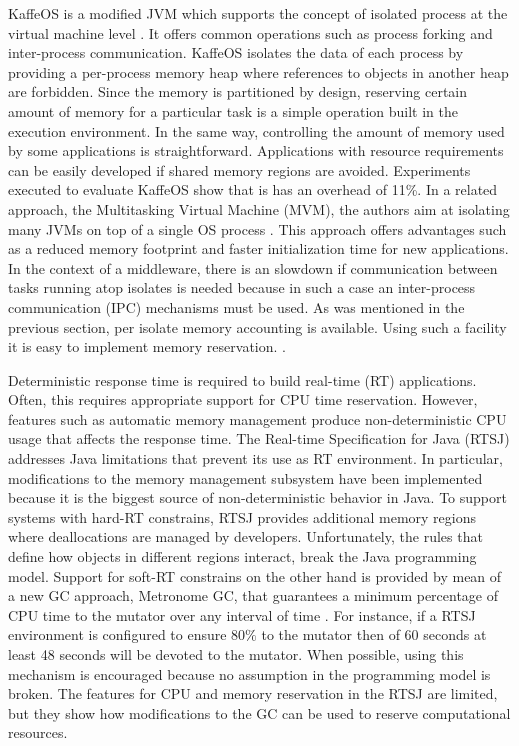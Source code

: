 KaffeOS is a modified JVM which supports the concept of isolated process at the virtual machine level \cite{back_processes_2000, Back:2005:KJR:1075382.1075383}.
It offers common operations such as process forking and inter-process communication.
KaffeOS isolates the data of each process by providing a per-process memory heap where references to objects in another heap are forbidden.
Since the memory is partitioned by design, reserving certain amount of memory for a particular task is a simple operation built in the execution environment.
In the same way, controlling the amount of memory used by some applications is straightforward.
Applications with resource requirements can be easily developed if shared memory regions are avoided.
Experiments executed to evaluate KaffeOS show that is has an overhead of 11\%.
In a related approach, the Multitasking Virtual Machine (MVM), the authors aim at isolating many JVMs on top of
a single OS process \cite{czajkowski_multitasking_2001}.
This approach offers advantages such as a reduced memory footprint and faster initialization time for new applications.
In the context of a middleware, there is an slowdown if communication between tasks running atop isolates is needed because in such a case an inter-process communication (IPC) mechanisms must be used.
As was mentioned in the previous section, per isolate memory accounting is available.
Using such a facility it is easy to implement memory reservation. . 

Deterministic response time is required to build real-time (RT) applications.
Often, this requires appropriate support for CPU time reservation. 
However, features such as automatic memory management produce non-deterministic CPU usage that affects the response time.
The Real-time Specification for Java (RTSJ) addresses Java limitations that prevent its use as RT environment.
In particular, modifications to the memory management subsystem have been implemented because it is the biggest source of non-deterministic behavior in Java.
To support systems with hard-RT constrains, RTSJ provides additional memory regions where deallocations are managed by developers.
Unfortunately, the rules that define how objects in different regions interact, break the Java programming model.
Support for soft-RT constrains on the other hand is provided by mean of a new GC approach, Metronome GC,  that guarantees a minimum percentage of CPU time to the mutator over any interval of time \cite{Bacon03themetronome:}.
For instance, if a RTSJ environment is configured to ensure 80$\%$ to the mutator then of 60 seconds at least 48 seconds will be devoted to the mutator.
When possible, using this mechanism is encouraged because no assumption in the programming model is broken.
The features for CPU and memory reservation in the RTSJ are limited, but they show how modifications to the GC can be used to reserve computational resources. 


